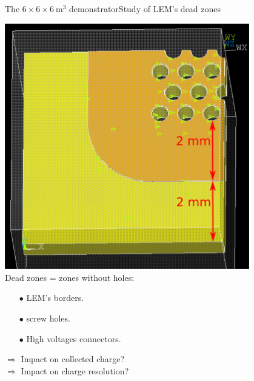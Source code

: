 \documentclass[10pt]{beamer}
\begin{document}
    \begin{frame}{The \texorpdfstring{$6 \times 6 \times \SI{6}{\meter\cubed}$}{666} demonstrator}{Study of LEM's dead zones}
   		\begin{scriptsize}
    		\begin{minipage}{0.38\textwidth}
    			\includegraphics[width=0.8\textwidth]{figures/666/corner_annotations.png}
    			\vspace{0.5cm}\\
    				Dead zones = zones without holes:
    				\begin{itemize}
    					\item[$\bullet$] LEM's borders.
    					\item[$\bullet$] screw holes.
    					\item[$\bullet$] High voltages connectors.
    				\end{itemize}
    				$\Rightarrow$ Impact on collected charge?\\
    				$\Rightarrow$ Impact on charge resolution?\\
    				

\end{minipage}
\end{scriptsize}
\end{frame}
\end{document}
